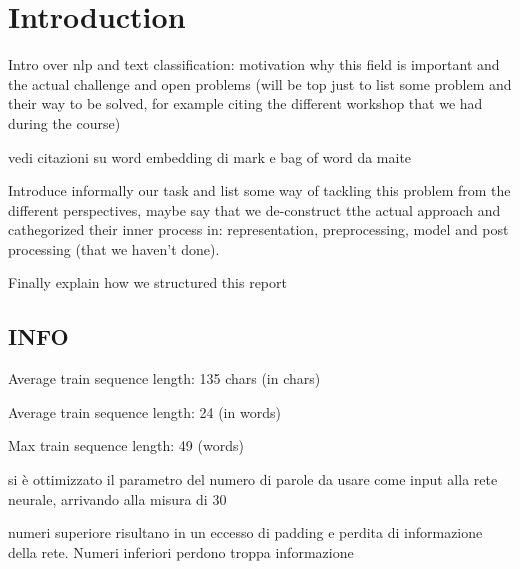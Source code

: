 \section{Introduction} \label{sec:introduction}

Intro over nlp and text classification: motivation why this field is important and the actual challenge and open problems (will be top just to list some problem and their way to be solved, for example citing the different workshop that we had during the course)

vedi citazioni su word embedding di mark e bag of word da maite

Introduce informally our task and list some way of tackling this problem from the different perspectives, maybe say that we de-construct tthe actual approach and cathegorized their inner process in: representation, preprocessing, model and post processing (that we haven't done).

Finally explain how we structured this report

\subsection{INFO}

Average train sequence length: 135 chars (in chars)

Average train sequence length: 24 (in words)

Max train sequence length: 49 (words)

si è ottimizzato il parametro del numero di parole da usare come input alla rete neurale, arrivando alla misura di 30

numeri superiore risultano in un eccesso di padding e perdita di informazione della rete. Numeri inferiori perdono troppa informazione
